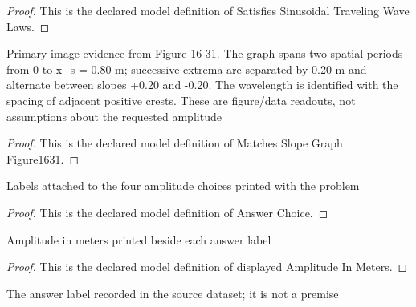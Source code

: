 \begin{proof}
  This is the declared model definition of Satisfies Sinusoidal Traveling Wave Laws.
\end{proof}
\begin{definition}
  \label{def:physics:phyx-mini-0287:phyxminiproblems-problemphyxmini0287-matchesslopegraphfigure1631}
  Primary-image evidence from Figure 16-31. The graph spans two spatial periods from 0 to x\_s = 0.80 m; successive extrema are separated by 0.20 m and alternate between slopes +0.20 and -0.20. The wavelength is identified with the spacing of adjacent positive crests. These are figure/data readouts, not assumptions about the requested amplitude
\end{definition}
\begin{proof}
  This is the declared model definition of Matches Slope Graph Figure1631.
\end{proof}
\begin{definition}
  \label{def:physics:phyx-mini-0287:phyxminiproblems-problemphyxmini0287-answerchoice}
  Labels attached to the four amplitude choices printed with the problem
\end{definition}
\begin{proof}
  This is the declared model definition of Answer Choice.
\end{proof}
\begin{definition}
  \label{def:physics:phyx-mini-0287:phyxminiproblems-problemphyxmini0287-displayedamplitudeinmeters}
  Amplitude in meters printed beside each answer label
\end{definition}
\begin{proof}
  This is the declared model definition of displayed Amplitude In Meters.
\end{proof}
\begin{definition}
  \label{def:physics:phyx-mini-0287:phyxminiproblems-problemphyxmini0287-recordeddatasetanswer}
  The answer label recorded in the source dataset; it is not a premise
\end{definition}
